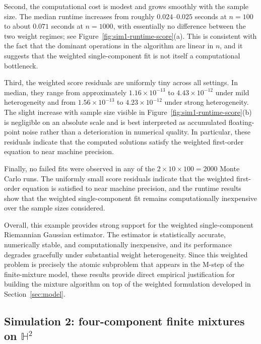\documentclass[11pt]{article}
\begin{document}
Second, the computational cost is modest and grows smoothly with the sample size. The median runtime increases from roughly \(0.024\)–\(0.025\) seconds at \(n=100\) to about \(0.071\) seconds at \(n=1000\), with essentially no difference between the two weight regimes; see Figure~\ref{fig:sim1-runtime-score}(a). This is consistent with the fact that the dominant operations in the algorithm are linear in \(n\), and it suggests that the weighted single-component fit is not itself a computational bottleneck.

Third, the weighted score residuals are uniformly tiny across all settings. In median, they range from approximately \(1.16\times 10^{-13}\) to \(4.43\times 10^{-12}\) under mild heterogeneity and from \(1.56\times 10^{-13}\) to \(4.23\times 10^{-12}\) under strong heterogeneity. The slight increase with sample size visible in Figure~\ref{fig:sim1-runtime-score}(b) is negligible on an absolute scale and is best interpreted as accumulated floating-point noise rather than a deterioration in numerical quality. In particular, these residuals indicate that the computed solutions satisfy the weighted first-order equation to near machine precision.


Finally, no failed fits were observed in any of the \(2\times 10\times 100=2000\) Monte Carlo runs. 
The uniformly small score residuals indicate that the weighted first-order equation is satisfied to near machine precision, and the runtime results show that the weighted single-component fit remains computationally inexpensive over the sample sizes considered.

Overall, this example provides strong support for the weighted single-component Riemannian Gaussian estimator. The estimator is statistically accurate, numerically stable, and computationally inexpensive, and its performance degrades gracefully under substantial weight heterogeneity. Since this weighted problem is precisely the atomic subproblem that appears in the M-step of the finite-mixture model, these results provide direct empirical justification for building the mixture algorithm on top of the weighted formulation developed in Section~\ref{sec:model}.


\subsection{Simulation 2: four-component finite mixtures on \(\mathbb{H}^2\)}\label{subsec:sim2}
\end{document}

